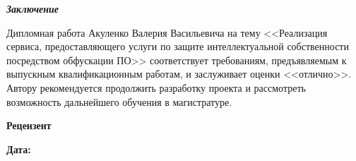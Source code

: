 \documentclass[12pt, a4paper, titlepage]{extarticle}
\begin{document}
	\pagebreak
	\textbf{\textit{Заключение}}

		Дипломная работа Акуленко Валерия Васильевича на тему <<Реализация сервиса, предоставляющего услуги по защите интеллектуальной собственности посредством обфускации ПО>> соответствует требованиям, предъявляемым к выпускным квалификационным работам, и заслуживает оценки <<отлично>>. Автору рекомендуется продолжить разработку проекта и рассмотреть возможность дальнейшего обучения в магистратуре.

	\textbf{Рецензент}

	\hfill {}

	\vspace{10pt}
	\textbf{Дата:} 
	\vspace{5pt}

	\vspace{35pt}
\end{document}
